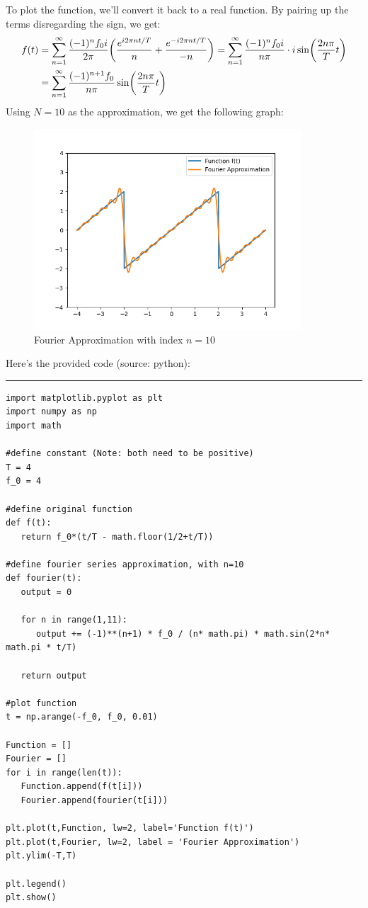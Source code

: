 \documentclass{article}
\DeclarePairedDelimiter{\paran}{(}{)}%
\begin{document}
\hfil

To plot the function, we'll convert it back to a real function. By pairing up the terms disregarding the sign, we get:
\begin{align}
    f(t)&= \sum_{n=1}^{\infty}\frac{(-1)^nf_0 i}{2\pi}\paran*{\frac{e^{i2\pi nt/T}}{n}+\frac{e^{-i2\pi nt/T}}{-n}} = \sum_{n=1}^{\infty}\frac{(-1)^nf_0 i}{n\pi}\cdot i\sin\paran*{\frac{2n\pi}{T}t}\\
    &= \sum_{n=1}^{\infty}\frac{(-1)^{n+1} f_0}{n\pi}\sin\paran*{\frac{2n\pi}{T}t}
\end{align}
Using $N=10$ as the approximation, we get the following graph:
\begin{figure}[h!]
    \begin{center}
        \includegraphics[width=100mm]{phys_103_hw2_q3_b.png}
        \caption{Fourier Approximation with index $n=10$}
    \end{center}
\end{figure}

Here's the provided code (source: python):

\rule{15.24cm}{0.01mm}
\begin{verbatim}
import matplotlib.pyplot as plt
import numpy as np
import math

#define constant (Note: both need to be positive)
T = 4
f_0 = 4

#define original function
def f(t):
   return f_0*(t/T - math.floor(1/2+t/T))

#define fourier series approximation, with n=10
def fourier(t):
   output = 0

   for n in range(1,11):
      output += (-1)**(n+1) * f_0 / (n* math.pi) * math.sin(2*n* math.pi * t/T)

   return output

#plot function
t = np.arange(-f_0, f_0, 0.01)

Function = []
Fourier = []
for i in range(len(t)):
   Function.append(f(t[i]))
   Fourier.append(fourier(t[i]))

plt.plot(t,Function, lw=2, label='Function f(t)')
plt.plot(t,Fourier, lw=2, label = 'Fourier Approximation')
plt.ylim(-T,T)

plt.legend()
plt.show()
\end{verbatim}
\end{document}
